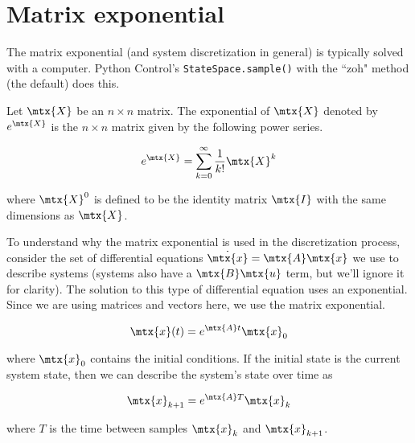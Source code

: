 \section{Matrix exponential}

The matrix exponential (and \gls{system} \gls{discretization} in general) is
typically solved with a computer. Python Control's \texttt{StateSpace.sample()}
with the ``zoh" method (the default) does this.

\begin{definition}
  Let $\mtx{X}$ be an $n \times n$ matrix. The exponential of $\mtx{X}$ denoted
  by $e^{\mtx{X}}$ is the $n \times n$ matrix given by the following power
  series.

  \begin{equation}
    e^{\mtx{X}} = \sum_{k=0}^\infty \frac{1}{k!} \mtx{X}^k \label{eq:mat_exp}
  \end{equation}

  where $\mtx{X}^0$ is defined to be the identity matrix $\mtx{I}$ with the same
  dimensions as $\mtx{X}$.
\end{definition}

To understand why the matrix exponential is used in the \gls{discretization}
process, consider the set of differential equations
$\dot{\mtx{x}} = \mtx{A}\mtx{x}$ we use to describe \glspl{system}
(\glspl{system} also have a $\mtx{B}\mtx{u}$ term, but we'll ignore it for
clarity). The solution to this type of differential equation uses an
exponential. Since we are using matrices and vectors here, we use the matrix
exponential.

\begin{equation*}
  \mtx{x}(t) = e^{\mtx{A}t} \mtx{x}_0
\end{equation*}

where $\mtx{x}_0$ contains the initial conditions. If the initial \gls{state} is
the current system \gls{state}, then we can describe the \gls{system}'s
\gls{state} over time as

\begin{equation*}
  \mtx{x}_{k+1} = e^{\mtx{A}T} \mtx{x}_k
\end{equation*}

where $T$ is the time between samples $\mtx{x}_k$ and $\mtx{x}_{k+1}$.
